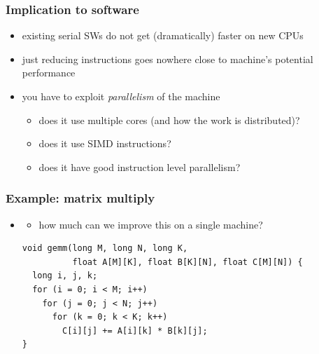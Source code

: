 \documentclass[12pt,dvipdfmx]{beamer}
\newcommand{\ao}[1]{{\color{blue}#1}}
\begin{document}
\begin{frame}
\frametitle{Implication to software}
\begin{itemize}
\item<1-> existing serial SWs do not get (dramatically) faster on new CPUs
\item<2-> just reducing instructions goes nowhere close to machine's potential performance
\item<3-> you have to exploit \ao{\it parallelism} of the machine
  \begin{itemize}
  \item does it use multiple cores (and how the work is distributed)?
  \item does it use SIMD instructions?
  \item does it have good instruction level parallelism?
  \end{itemize}
\end{itemize}
\end{frame}

\begin{frame}[fragile]
\frametitle{Example: matrix multiply}

\begin{itemize}
\item []
  \begin{itemize}
  \item how much can we improve this on a single machine?
  \end{itemize}

\begin{lstlisting}
void gemm(long M, long N, long K,
          float A[M][K], float B[K][N], float C[M][N]) {
  long i, j, k;
  for (i = 0; i < M; i++)
    for (j = 0; j < N; j++)
      for (k = 0; k < K; k++)
        C[i][j] += A[i][k] * B[k][j];
}
\end{lstlisting}

\end{itemize}

\end{frame}
\end{document}
